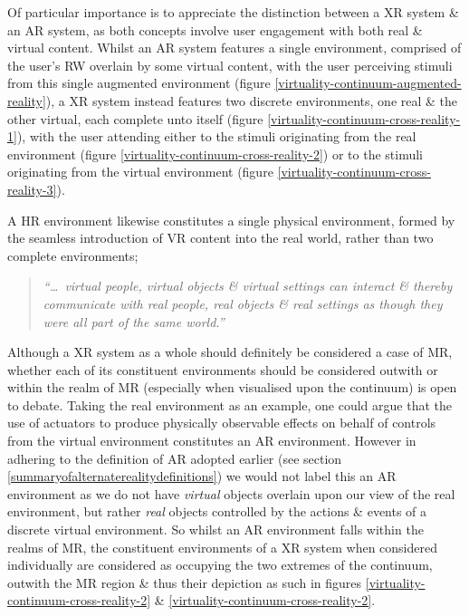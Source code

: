 
Of particular importance is to appreciate the distinction between a XR system \& an AR system\avxrfootnote{}, as both concepts involve user engagement with both real \& virtual content. Whilst an AR system features a single environment, comprised of the user's RW overlain by some virtual content, with the user perceiving stimuli from this single augmented environment (figure \ref{virtuality-continuum-augmented-reality}), a XR system instead features two discrete environments, one real \& the other virtual, each complete unto itself (figure \ref{virtuality-continuum-cross-reality-1}), with the user attending either to the stimuli originating from the real environment (figure \ref{virtuality-continuum-cross-reality-2}) or to the stimuli originating from the virtual environment (figure \ref{virtuality-continuum-cross-reality-3}).

A HR environment likewise constitutes a single physical environment, formed by the seamless introduction of VR content into the real world, rather than two complete environments;


\begin{quote}
	\textit{``\ldots\ virtual people, virtual objects \& virtual settings can interact \& thereby communicate with real people, real objects \& real settings as though they were all part of the same world.''}~\cite{Terashima2001}
\end{quote}

Although a XR system as a whole should definitely be considered a case of MR, whether each of its constituent environments should be considered outwith or within the realm of MR (especially when visualised upon the continuum) is open to debate. Taking the real environment as an example, one could argue that the use of actuators to produce physically observable effects on behalf of controls from the virtual environment constitutes an AR environment. However in adhering to the definition of AR adopted earlier (see section \ref{summaryofalternaterealitydefinitions}) we would not label this an AR environment as we do not have \textit{virtual} objects overlain upon our view of the real environment, but rather \textit{real} objects controlled by the actions \& events of a discrete virtual environment. So whilst an AR environment falls within the realms of MR, the constituent environments of a XR system when considered individually are considered as occupying the two extremes of the continuum, outwith the MR region \& thus their depiction as such in figures \ref{virtuality-continuum-cross-reality-2} \& \ref{virtuality-continuum-cross-reality-2}.

